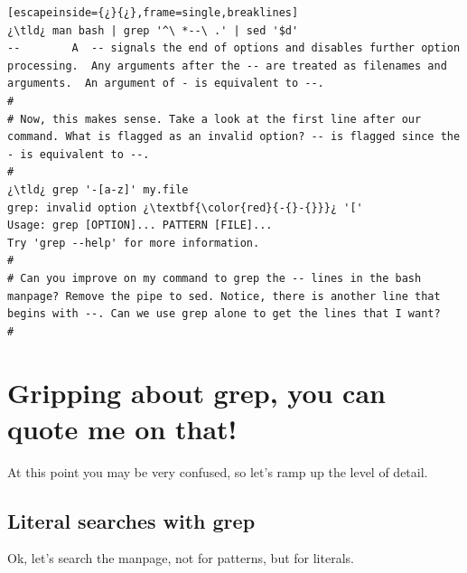 \begin{lstlisting}[escapeinside={¿}{¿},frame=single,breaklines]
¿\tld¿ man bash | grep '^\ *--\ .' | sed '$d'
--        A  -- signals the end of options and disables further option processing.  Any arguments after the -- are treated as filenames and arguments.  An argument of - is equivalent to --.
#
# Now, this makes sense. Take a look at the first line after our command. What is flagged as an invalid option? -- is flagged since the  - is equivalent to --.
#
¿\tld¿ grep '-[a-z]' my.file
grep: invalid option ¿\textbf{\color{red}{-{}-{}}}¿ '['
Usage: grep [OPTION]... PATTERN [FILE]...
Try 'grep --help' for more information.
#
# Can you improve on my command to grep the -- lines in the bash manpage? Remove the pipe to sed. Notice, there is another line that begins with --. Can we use grep alone to get the lines that I want?
#
\end{lstlisting}

\section{Gripping about grep, you can quote me on that!}

At this point you may be very confused, so let's ramp up the level of detail.

\subsection{Literal searches with grep}

Ok, let's search the  manpage, not for patterns, but for literals. 

